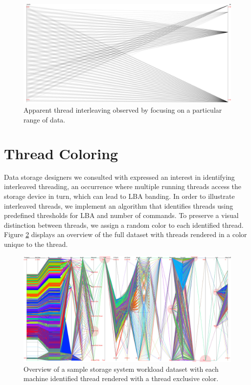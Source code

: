 \documentclass[12pt]{ucthesis}
\begin{document}
\begin{figure}[h!]
 \centering
 \includegraphics[width=\textwidth]{images/interleaved_bw.pdf}
 \caption[Thread interleaving observed by focusing on a range of data.]{Apparent thread interleaving observed by focusing on a particular range of data.}
 \label{fig:focus_interleaving}
\end{figure}

\section{Thread Coloring}
Data storage designers we consulted with expressed an interest in identifying interleaved threading, an occurrence where multiple running threads access the storage device in turn, which can lead to LBA banding. In order to illustrate interleaved threads, we implement an algorithm that identifies threads using predefined thresholds for LBA and number of commands. To preserve a visual distinction between threads, we assign a random color to each identified thread. Figure \ref{fig:color_overview} displays an overview of the full dataset with threads rendered in a color unique to the thread.

\begin{figure}[h!]
 \centering
 \includegraphics[width=\textwidth]{images/color_overview.pdf}
 \caption[Identified threads rendered with a thread exclusive color.]{Overview of a sample storage system workload dataset with each machine identified thread rendered with a thread exclusive color.}
 \label{fig:color_overview}
\end{figure}
\end{document}
